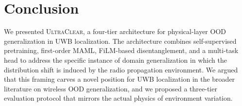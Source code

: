 \documentclass[11pt,letterpaper]{article}
\begin{document}
\section{Conclusion}
\label{sec:conclusion}

We presented \textsc{UltraClear}, a four-tier architecture for
physical-layer OOD generalization in UWB localization. The
architecture combines self-supervised pretraining, first-order
MAML, FiLM-based disentanglement, and a multi-task head to
address the specific instance of domain generalization in
which the distribution shift is induced by the radio
propagation environment. We argued that this framing carves a
novel position for UWB localization in the broader literature
on wireless OOD generalization, and we proposed a
three-tier evaluation protocol that mirrors the actual physics
of environment variation.



\end{document}
